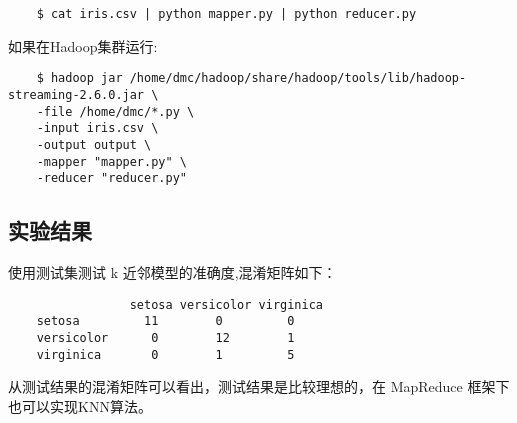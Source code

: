 \begin{lstlisting}
	$ cat iris.csv | python mapper.py | python reducer.py
\end{lstlisting}
如果在Hadoop集群运行:

\begin{lstlisting}
	$ hadoop jar /home/dmc/hadoop/share/hadoop/tools/lib/hadoop-streaming-2.6.0.jar \
	-file /home/dmc/*.py \     
	-input iris.csv \
	-output output \
	-mapper "mapper.py" \
	-reducer "reducer.py"
\end{lstlisting}

\subsection{实验结果}\label{ux5b9eux9a8cux7ed3ux679c}



使用测试集测试 k 近邻模型的准确度,混淆矩阵如下：

\begin{lstlisting}
	             setosa versicolor virginica
	setosa         11        0         0
	versicolor      0        12        1
	virginica       0        1         5
\end{lstlisting}

{\color{red}从测试结果的混淆矩阵可以看出，测试结果是比较理想的，在 MapReduce 框架下也可以实现KNN算法。}
